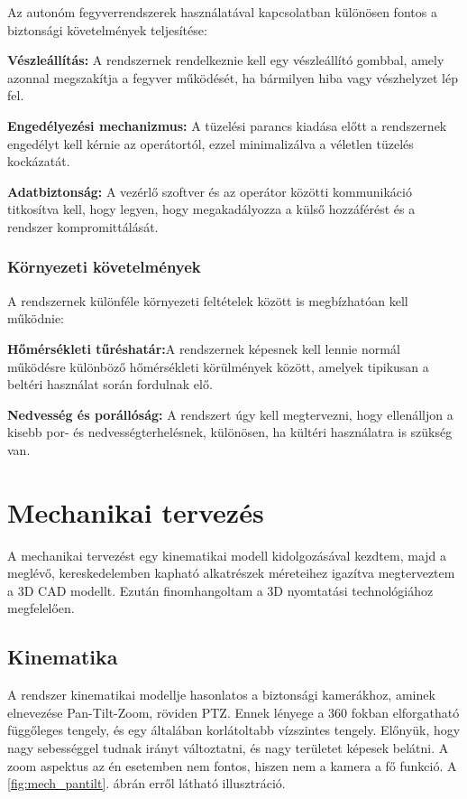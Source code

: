 \documentclass[12pt,a4paper]{article}
\begin{document}
Az autonóm fegyverrendszerek használatával kapcsolatban különösen fontos a biztonsági követelmények teljesítése:

\begin{list}{}{}
	\item \textbf{Vészleállítás:} A rendszernek rendelkeznie kell egy vészleállító gombbal, amely azonnal megszakítja a fegyver működését, ha bármilyen hiba vagy vészhelyzet lép fel.
	\item \textbf{Engedélyezési mechanizmus:} A tüzelési parancs kiadása előtt a rendszernek engedélyt kell kérnie az operátortól, ezzel minimalizálva a véletlen tüzelés kockázatát.
	\item\textbf{ Adatbiztonság:} A vezérlő szoftver és az operátor közötti kommunikáció titkosítva kell, hogy legyen, hogy megakadályozza a külső hozzáférést és a rendszer kompromittálását.
\end{list}

\subsubsection*{Környezeti követelmények}

A rendszernek különféle környezeti feltételek között is megbízhatóan kell működnie:

\begin{list}{}{}
	\item \textbf{Hőmérsékleti tűréshatár:}A rendszernek képesnek kell lennie normál működésre különböző hőmérsékleti körülmények között, amelyek tipikusan a beltéri használat során fordulnak elő.
	\item \textbf{Nedvesség és porállóság:} A rendszert úgy kell megtervezni, hogy ellenálljon a kisebb por- és nedvességterhelésnek, különösen, ha kültéri használatra is szükség van.
\end{list}

\pagebreak
\section{Mechanikai tervezés}
A mechanikai tervezést egy kinematikai modell kidolgozásával kezdtem, majd a meglévő, kereskedelemben kapható alkatrészek méreteihez igazítva megterveztem a 3D CAD modellt. Ezután finomhangoltam a 3D nyomtatási technológiához megfelelően.
\subsection{Kinematika}
A rendszer kinematikai modellje hasonlatos a biztonsági kamerákhoz, aminek elnevezése Pan-Tilt-Zoom, röviden PTZ. Ennek lényege a 360 fokban elforgatható függőleges tengely, és egy általában korlátoltabb vízszintes tengely. Előnyük, hogy nagy sebességgel tudnak irányt változtatni, és nagy területet képesek belátni. A zoom aspektus az én esetemben nem fontos, hiszen nem a kamera a fő funkció. A \ref{fig:mech_pantilt}. ábrán erről látható illusztráció.
\end{document}

